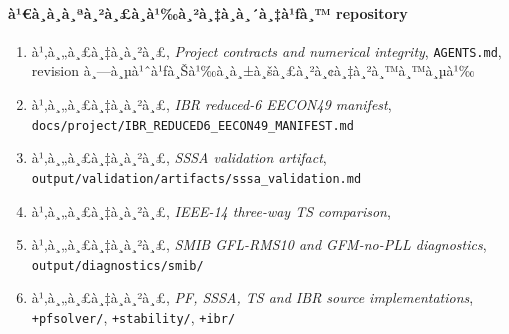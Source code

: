 ﻿\documentclass[12pt,a4paper]{article}
\begin{document}
\paragraph{à¹€à¸­à¸à¸ªà¸²à¸£à¸­à¹‰à¸²à¸‡à¸­à¸´à¸‡à¹ƒà¸™ repository}
\begin{enumerate}
\item à¹‚à¸„à¸£à¸‡à¸à¸²à¸£, \textit{Project contracts and numerical integrity},
      \texttt{AGENTS.md}, revision à¸—à¸µà¹ˆà¹ƒà¸Šà¹‰à¸à¸±à¸šà¸£à¸²à¸¢à¸‡à¸²à¸™à¸™à¸µà¹‰
\item à¹‚à¸„à¸£à¸‡à¸à¸²à¸£, \textit{IBR reduced-6 EECON49 manifest},
      \texttt{docs/project/IBR\_REDUCED6\_EECON49\_MANIFEST.md}
\item à¹‚à¸„à¸£à¸‡à¸à¸²à¸£, \textit{SSSA validation artifact},
      \texttt{output/validation/artifacts/sssa\_validation.md}
\item à¹‚à¸„à¸£à¸‡à¸à¸²à¸£, \textit{IEEE-14 three-way TS comparison},
\item à¹‚à¸„à¸£à¸‡à¸à¸²à¸£, \textit{SMIB GFL-RMS10 and GFM-no-PLL diagnostics},
      \texttt{output/diagnostics/smib/}
\item à¹‚à¸„à¸£à¸‡à¸à¸²à¸£, \textit{PF, SSSA, TS and IBR source implementations},
      \texttt{+pfsolver/}, \texttt{+stability/}, \texttt{+ibr/}
\end{enumerate}

\begin{center}
\end{center}
\end{document}
